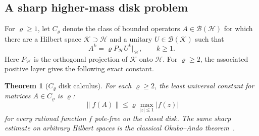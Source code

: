 \documentclass[preprints,article,submit,oneauthor]{Definitions/mdpi}
\newcounter{manuscriptresult}[section]
\theoremstyle{mdpi}
\newtheorem{theorem}[manuscriptresult]{Theorem}
\theoremstyle{definition}
\begin{document}
\subsection{A sharp higher-mass disk problem}

For $\varrho\geq1$, let $C_\varrho$ denote the class of bounded
operators $A\in\mathcal B(\mathcal H)$ for which there are a Hilbert
space $\mathcal K\supset\mathcal H$ and a unitary
$U\in\mathcal B(\mathcal K)$ such that
\[
  A^k=\varrho P_{\mathcal H}U^k|_{\mathcal H},
  \qquad k\geq1.
\]
Here $P_{\mathcal H}$ is the orthogonal projection of $\mathcal K$
onto $\mathcal H$.
For $\varrho\geq2$, the associated positive layer gives the following
exact constant.

\begin{theorem}[$C_\varrho$ disk calculus]
\label{thm:rho-contraction-discussion}
For each $\varrho\geq2$, the least universal constant for matrices
$A\in C_\varrho$ is $\varrho$:
\begin{equation}
  \lVert f(A)\rVert\leq\varrho
  \max_{\lvert z\rvert\leq1}\lvert f(z)\rvert
  \label{eq:rho-contraction-discussion}
\end{equation}
for every rational function $f$ pole-free on the closed disk.
The same sharp estimate on arbitrary Hilbert spaces is the classical
Okubo--Ando theorem~\cite{OkuboAndo1975}.
\end{theorem}
\end{document}
